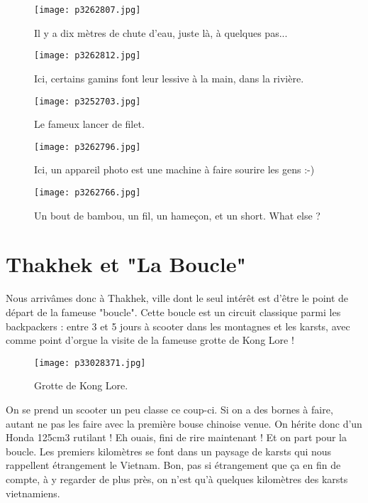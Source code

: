\documentclass{book}
\begin{document}
\begin{figure}[h]
\centering
\texttt{[image: p3262807.jpg]}
\caption*{Il y a dix mètres de chute d'eau, juste là, à quelques pas...}
\end{figure}


\begin{figure}[h]
\centering
\texttt{[image: p3262812.jpg]}
\caption*{Ici, certains gamins font leur lessive à la main, dans la rivière.}
\end{figure}


\begin{figure}[h]
\centering
\texttt{[image: p3252703.jpg]}
\caption*{Le fameux  lancer de filet.}
\end{figure}


\begin{figure}[h]
\centering
\texttt{[image: p3262796.jpg]}
\caption*{Ici, un appareil photo est une machine à faire sourire les gens :-)}
\end{figure}


\begin{figure}[h]
\centering
\texttt{[image: p3262766.jpg]}
\caption*{Un bout de bambou, un fil, un hameçon, et un short. What else ?}
\end{figure}



\chapter{Thakhek et "La Boucle"}
Nous arrivâmes donc à Thakhek, ville dont le seul intérêt est d'être le point de départ de la fameuse "boucle". Cette boucle est un circuit classique parmi les backpackers : entre 3 et 5 jours à scooter dans les montagnes et les karsts, avec comme point d'orgue la visite de la fameuse grotte de Kong Lore !


\begin{figure}[h]
\centering
\texttt{[image: p33028371.jpg]}
\caption*{Grotte de Kong Lore.}
\end{figure}

On se prend un scooter un peu classe ce coup-ci. Si on a des bornes à faire, autant ne pas les faire avec la première bouse chinoise venue. On hérite donc d'un Honda 125cm3 rutilant ! Eh ouais, fini de rire maintenant ! Et on part pour la boucle. Les premiers kilomètres se font dans un paysage de karsts qui nous rappellent étrangement le Vietnam. Bon, pas si étrangement que ça en fin de compte, à y regarder de plus près, on n'est qu'à quelques kilomètres des karsts vietnamiens.
\end{document}

